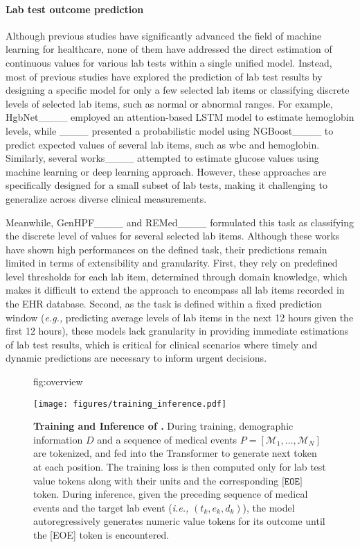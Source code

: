 \paragraph{Lab test outcome prediction}
Although previous studies have significantly advanced the field of machine learning for healthcare, none of them have addressed the direct estimation of continuous values for various lab tests within a single unified model.
Instead, most of previous studies have explored the prediction of lab test results by designing a specific model for only a few selected lab items or classifying discrete levels of selected lab items, such as normal or abnormal ranges.
For example, HgbNet____ employed an attention-based LSTM model to estimate hemoglobin levels, while ____ presented a probabilistic model using NGBoost____ to predict expected values of several lab items, such as wbc and hemoglobin.
Similarly, several works____ attempted to estimate glucose values using machine learning or deep learning approach.
However, these approaches are specifically designed for a small subset of lab tests, making it challenging to generalize across diverse clinical measurements.

Meanwhile, GenHPF____ and REMed____ formulated this task as classifying the discrete level of values for several selected lab items.
Although these works have shown high performances on the defined task, their predictions remain limited in terms of extensibility and granularity.
First, they rely on predefined level thresholds for each lab item, determined through domain knowledge, which makes it difficult to extend the approach to encompass all lab items recorded in the EHR database.
Second, as the task is defined within a fixed prediction window (\textit{e.g.,} predicting average levels of lab items in the next 12 hours given the first 12 hours), these models lack granularity in providing immediate estimations of lab test results, which is critical for clinical scenarios where timely and dynamic predictions are necessary to inform urgent decisions.

\begin{figure*}[ht] %
\floatconts
    {fig:overview}
    {\vspace{-8mm}
    \caption{\textbf{Training and Inference of \ours{}.} During training, demographic information $D$ and a sequence of medical events $P=[\mathcal{M}_1,\dotsc,\mathcal{M}_N]$ are tokenized, and fed into the Transformer to generate next token at each position. The training loss is then computed only for lab test value tokens along with their units and the corresponding $\texttt{[EOE]}$ token. During inference, given the preceding sequence of medical events and the target lab event (\textit{i.e.,} $(t_k,e_k,d_k)$), the model autoregressively generates numeric value tokens for its outcome until the [EOE] token is encountered.}}
    {
        \texttt{[image: figures/training\_inference.pdf]}
    }
    \vspace{-6mm}
\end{figure*}